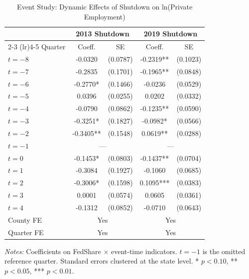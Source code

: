 \begin{table}[t]
\centering
\caption{Event Study: Dynamic Effects of Shutdown on ln(Private Employment)}
\label{tab:eventstudy}
\begin{tabular}{l cc cc}
\hline\hline
& \multicolumn{2}{c}{2013 Shutdown} & \multicolumn{2}{c}{2019 Shutdown} \\
\cmidrule(lr){2-3} \cmidrule(lr){4-5}
Quarter & Coeff. & SE & Coeff. & SE \\
\hline
$t = -8$ & -0.0320 & (0.0787) & -0.2319** & (0.1023) \\
$t = -7$ & -0.2835 & (0.1701) & -0.1965** & (0.0848) \\
$t = -6$ & -0.2770* & (0.1466) & -0.0236 & (0.0529) \\
$t = -5$ & 0.0396 & (0.0255) & 0.0202 & (0.0332) \\
$t = -4$ & -0.0790 & (0.0862) & -0.1235** & (0.0590) \\
$t = -3$ & -0.3251* & (0.1827) & -0.0982* & (0.0566) \\
$t = -2$ & -0.3405** & (0.1548) & 0.0619** & (0.0288) \\
$t = -1$ & \multicolumn{2}{c}{---} & \multicolumn{2}{c}{---} \\
$t = 0$ & -0.1453* & (0.0803) & -0.1437** & (0.0704) \\
$t = 1$ & -0.3084 & (0.1927) & -0.1060 & (0.0685) \\
$t = 2$ & -0.3006* & (0.1598) & 0.1095*** & (0.0383) \\
$t = 3$ & 0.0001 & (0.0574) & 0.0605 & (0.0361) \\
$t = 4$ & -0.1312 & (0.0852) & -0.0710 & (0.0643) \\
\hline
County FE & \multicolumn{2}{c}{Yes} & \multicolumn{2}{c}{Yes} \\
Quarter FE & \multicolumn{2}{c}{Yes} & \multicolumn{2}{c}{Yes} \\
\hline\hline
\end{tabular}
\par\vspace{0.5em}\raggedright\small\textit{Notes:} Coefficients on FedShare $\times$ event-time indicators. $t = -1$ is the omitted reference quarter. Standard errors clustered at the state level. * $p < 0.10$, ** $p < 0.05$, *** $p < 0.01$.
\end{table}
